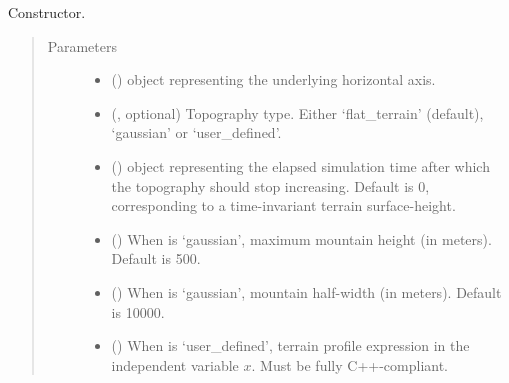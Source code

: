\documentclass[letterpaper,10pt,english]{sphinxmanual}
\begin{document}
\begin{fulllineitems}
\begin{quote}
\begin{description}
\begin{itemize}
\end{itemize}

\end{description}\end{quote}

\begin{fulllineitems}
\label{\detokenize{api:grids.topography.Topography1d.__init__}}
Constructor.
\begin{quote}\begin{description}
\item[{Parameters}] \leavevmode\begin{itemize}
\item {} 
 () \textendash{} {\hyperref[\detokenize{api:grids.axis.Axis}]{}} object representing the underlying horizontal axis.

\item {} 
 (, optional) \textendash{} Topography type. Either ‘flat\_terrain’ (default), ‘gaussian’
or ‘user\_defined’.

\item {} 
 () \textendash{}  object representing the elapsed simulation time
after which the topography should stop increasing. Default is 0, corresponding to a
time-invariant terrain surface-height.

\item {} 
 () \textendash{} When  is ‘gaussian’, maximum mountain
height (in meters). Default is 500.

\item {} 
 () \textendash{} When  is ‘gaussian’, mountain half-width
(in meters). Default is 10000.

\item {} 
 () \textendash{} When  is ‘user\_defined’, terrain profile expression
in the independent variable \(x\). Must be fully C++-compliant.


\end{itemize}
\end{description}
\end{quote}
\end{fulllineitems}
\end{fulllineitems}
\end{document}
